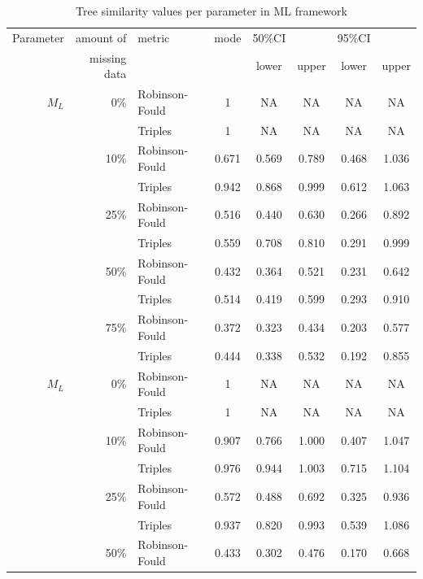 \documentclass[12pt,letterpaper]{article}
\begin{document}
\begin{table}
\caption{Tree similarity values per parameter in ML framework}
\centering
\begin{tabular}{rrlccccc}
    \hline
    Parameter & amount of    & metric & mode & 50\%CI &       & 95\%CI &       \\
              & missing data &        &      & lower  & upper & lower  & upper \\
    \hline
    $M_L$     & 0\%          & Robinson-Fould & 1 & NA  & NA & NA  & NA \\
              &              & Triples        & 1 & NA  & NA & NA  & NA \\
              & 10\%         & Robinson-Fould & 0.671 & 0.569  & 0.789 & 0.468  & 1.036 \\ %
              &              & Triples        & 0.942 & 0.868  & 0.999 & 0.612  & 1.063 \\
              & 25\%         & Robinson-Fould & 0.516 & 0.440  & 0.630 & 0.266  & 0.892 \\
              &              & Triples        & 0.559 & 0.708  & 0.810 & 0.291  & 0.999 \\
              & 50\%         & Robinson-Fould & 0.432 & 0.364  & 0.521 & 0.231  & 0.642 \\
              &              & Triples        & 0.514 & 0.419  & 0.599 & 0.293  & 0.910 \\
              & 75\%         & Robinson-Fould & 0.372 & 0.323  & 0.434 & 0.203  & 0.577 \\
              &              & Triples        & 0.444 & 0.338  & 0.532 & 0.192  & 0.855 \\
    $M_L$     & 0\%          & Robinson-Fould & 1 & NA  & NA & NA  & NA \\
              &              & Triples        & 1 & NA  & NA & NA  & NA \\
              & 10\%         & Robinson-Fould & 0.907 & 0.766  & 1.000 & 0.407  & 1.047 \\
              &              & Triples        & 0.976 & 0.944  & 1.003 & 0.715  & 1.104 \\
              & 25\%         & Robinson-Fould & 0.572 & 0.488  & 0.692 & 0.325  & 0.936 \\
              &              & Triples        & 0.937 & 0.820  & 0.993 & 0.539  & 1.086 \\
              & 50\%         & Robinson-Fould & 0.433 & 0.302  & 0.476 & 0.170  & 0.668 \\

\end{tabular}
\end{table}
\end{document}
